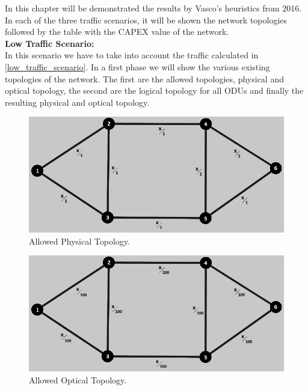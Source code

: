 In this chapter will be demonstrated the results by Vasco's heuristics from 2016. In each of the three traffic scenarios, it will be shown the network topologies followed by the table with the CAPEX value of the network.\\

\textbf{Low Traffic Scenario:}\\

In this scenario we have to take into account the traffic calculated in \ref{low_traffic_scenario}. In a first phase we will show the various existing topologies of the network. The first are the allowed topologies, physical and optical topology, the second are the logical topology for all ODUs and finally the resulting physical and optical topology.\\

\begin{figure}[H]
\centering
\includegraphics[width=13cm]{sdf/heuristic/figures/topologies/opaque_surv/low/allowed_physical_low}
\caption{Allowed Physical Topology.}
\label{allowed_physical_surv_ref_low_heuristic}
\end{figure}

\begin{figure}[H]
\centering
\includegraphics[width=13cm]{sdf/heuristic/figures/topologies/opaque_surv/low/allowed_optical_low}
\caption{Allowed Optical Topology.}
\label{allowed_optical_surv_ref_low_heuristic}
\end{figure}

